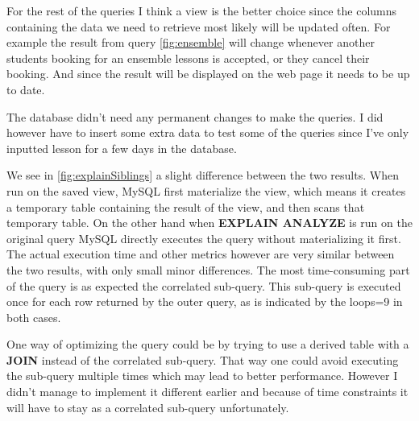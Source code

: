 \documentclass[a4paper]{scrreprt}
\begin{document}
For the rest of the queries I think a view is the better choice since the columns containing the data we need to retrieve most likely will be updated often. For example 
the result from query \ref{fig:ensemble} will change whenever another students booking for an ensemble lessons is accepted, or they cancel their booking. And since the 
result will be displayed on the web page it needs to be up to date.

The database didn't need any permanent changes to make the queries. I did however have to insert some extra data to test some of the queries since I've only inputted lesson for a few days in the database. 


We see in \ref{fig:explainSiblings} a slight difference between the two results. When run on the saved view, MySQL first materialize the view, which means it creates a temporary table containing 
the result of the view, and then scans that temporary table. On the other hand when \textbf{EXPLAIN ANALYZE} is run on the original query MySQL directly executes the query without materializing it first.
The actual execution time and other metrics however are very similar between the two results, with only small minor differences. The most time-consuming part of the query is as expected 
the correlated sub-query. This sub-query is executed once for each row returned by the outer query, as is indicated by the loops=9 in both cases.

One way of optimizing the query could be by trying to use a derived table with a \textbf{JOIN} instead of the correlated sub-query. That way one could avoid executing the sub-query multiple times which may 
lead to better performance. However I didn't manage to implement it different earlier and because of time constraints it will have to stay as a correlated sub-query unfortunately.
\end{document}
